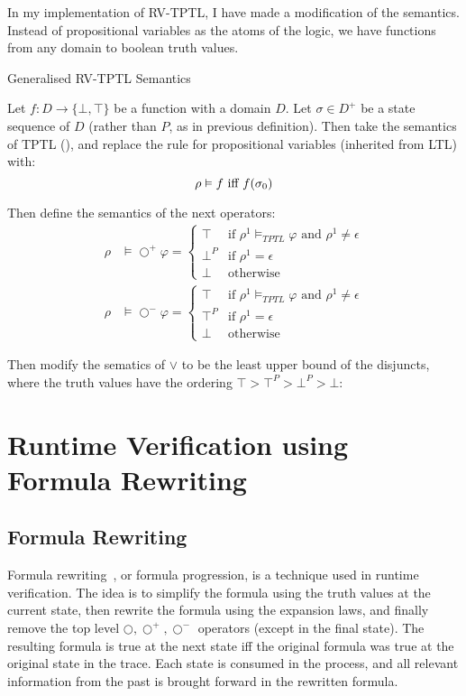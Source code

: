 \documentclass[a4paper]{article}
\newcommand{\tand}{\text{ and }}
\newcommand{\tor}{\text{ or }}
\newcommand{\tiff}{\text{ iff }}
\newcommand{\sn}{\bigcirc^+}
\newcommand{\wn}{\bigcirc^-}
\begin{document}
In my implementation of RV-TPTL, I have made a modification of the semantics. Instead of propositional variables as the atoms of the logic, we have functions from any domain to boolean truth values.

\begin{defn}{Generalised RV-TPTL Semantics}

  Let $f:D\to\{\bot,\top\}$ be a function with a domain $D$. Let $\sigma\in D^+$ be a state sequence of $D$ (rather than $P$, as in previous definition). Then take the semantics of TPTL (), and replace the rule for propositional variables (inherited from LTL) with:
  \[ \rho \vDash f \tiff f(\sigma_0)\\ \]

  Then define the semantics of the next operators:
  \begin{align*}
    \rho&\vDash\sn\varphi =
    \begin{cases}
      \top &\text{if } \rho^1\vDash_{TPTL}\varphi \tand \rho^1 \neq \epsilon\\
      \bot^P &\text{if } \rho^1 = \epsilon\\
      \bot &\text{otherwise}
    \end{cases}\\
    \rho&\vDash\wn\varphi =
    \begin{cases}
      \top &\text{if } \rho^1\vDash_{TPTL}\varphi \tand \rho^1 \neq \epsilon\\
      \top^P &\text{if } \rho^1 = \epsilon\\
      \bot &\text{otherwise}
    \end{cases}
  \end{align*}

  Then modify the sematics of $\lor$ to be the least upper bound of the disjuncts, where the truth values have the ordering \(\top>\top^P>\bot^P>\bot\):
  \[\] %

\end{defn}

\section{Runtime Verification using Formula Rewriting}
\subsection{Formula Rewriting}
Formula rewriting~\autocite{rosu2005rewriting}, or formula progression, is a technique used in runtime verification.
The idea is to simplify the formula using the truth values at the current state, then rewrite the formula using the expansion laws, and finally remove the top level $\bigcirc,\sn,\wn$ operators (except in the final state). The resulting formula is true at the next state iff the original formula was true at the original state in the trace.
Each state is consumed in the process, and all relevant information from the past is brought forward in the rewritten formula.
\end{document}
